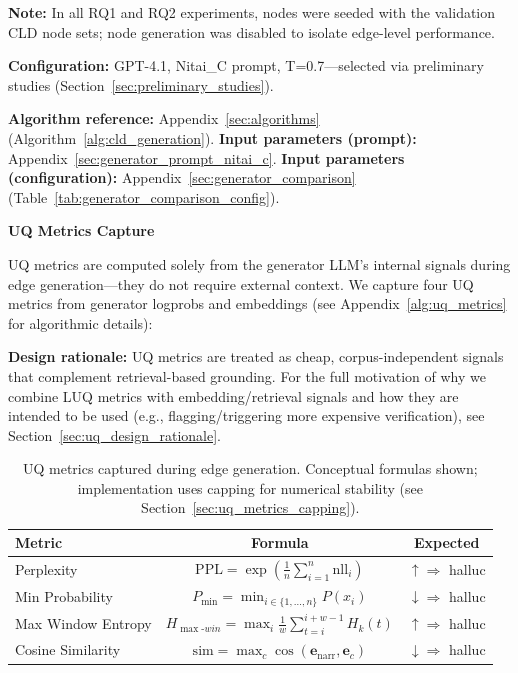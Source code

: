 \textbf{Note:} In all RQ1 and RQ2 experiments, nodes were seeded with the validation CLD node sets; node generation was disabled to isolate edge-level performance.

\textbf{Configuration:} GPT-4.1, Nitai\_C prompt, T=0.7---selected via preliminary studies (Section~\ref{sec:preliminary_studies}).

\textbf{Algorithm reference:} Appendix~\ref{sec:algorithms} (Algorithm~\ref{alg:cld_generation}). \textbf{Input parameters (prompt):} Appendix~\ref{sec:generator_prompt_nitai_c}. \textbf{Input parameters (configuration):} Appendix~\ref{sec:generator_comparison} (Table~\ref{tab:generator_comparison_config}).

\noindent\textbf{UQ Metrics Capture}
\label{sec:uq_metrics_definition}

UQ metrics are computed solely from the generator LLM's internal signals during edge generation---they do not require external context. We capture four UQ metrics from generator logprobs and embeddings (see Appendix~\ref{alg:uq_metrics} for algorithmic details):

\textbf{Design rationale:} UQ metrics are treated as cheap, corpus-independent signals that complement retrieval-based grounding. For the full motivation of why we combine LUQ metrics with embedding/retrieval signals and how they are intended to be used (e.g., flagging/triggering more expensive verification), see Section~\ref{sec:uq_design_rationale}.

\begin{table}[H]
\centering
\footnotesize
\caption{UQ metrics captured during edge generation. Conceptual formulas shown; implementation uses capping for numerical stability (see Section~\ref{sec:uq_metrics_capping}).}
\label{tab:uq_metrics_summary}
\begin{tabular}{@{}lcc@{}}
\toprule
\textbf{Metric} & \textbf{Formula} & \textbf{Expected} \\
\midrule
Perplexity & $\displaystyle\mathrm{PPL} = \exp\left(\frac{1}{n}\sum_{i=1}^{n} \mathrm{nll}_i\right)$ & $\uparrow \Rightarrow$ halluc \\[1.5ex]
Min Probability & $\displaystyle P_{\min} = \min_{i \in \{1,\ldots,n\}} P(x_i)$ & $\downarrow \Rightarrow$ halluc \\[1.5ex]
Max Window Entropy & $\displaystyle H_{\max\text{-}win} = \max_{i}\frac{1}{w}\sum_{t=i}^{i+w-1} H_k(t)$ & $\uparrow \Rightarrow$ halluc \\[1.5ex]
Cosine Similarity & $\displaystyle\mathrm{sim} = \max_c \cos(\mathbf{e}_{\mathrm{narr}},\mathbf{e}_c)$ & $\downarrow \Rightarrow$ halluc \\
\bottomrule
\end{tabular}
\end{table}

